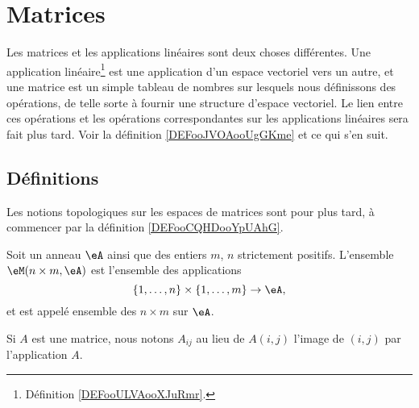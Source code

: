 
\section{Matrices}

Les matrices et les applications linéaires sont deux choses différentes. Une application linéaire\footnote{Définition \ref{DEFooULVAooXJuRmr}.} est une application d'un espace vectoriel vers un autre, et une matrice est un simple tableau de nombres sur lesquels nous définissons des opérations, de telle sorte à fournir une structure d'espace vectoriel. Le lien entre ces opérations et les opérations correspondantes sur les applications linéaires sera fait plus tard. Voir la définition \ref{DEFooJVOAooUgGKme} et ce qui s'en suit.

\subsection{Définitions}

Les notions topologiques sur les espaces de matrices sont pour plus tard, à commencer par la définition \ref{DEFooCQHDooYpUAhG}.

\begin{definition}
	Soit un anneau \( \eA\) ainsi que des entiers \( m\), \( n\) strictement positifs. L'ensemble \( \eM(n\times m,\eA)\) est l'ensemble des applications
	\begin{equation}
		\{ 1,\ldots, n \}\times \{ 1,\ldots, m \}\to \eA,
	\end{equation}
	et est appelé ensemble des  \(n\times m\) sur \( \eA \).
\end{definition}
Si \( A\) est une matrice, nous notons \( A_{ij}\) au lieu de \( A(i,j)\) l'image de \( (i,j)\) par l'application \( A\).


